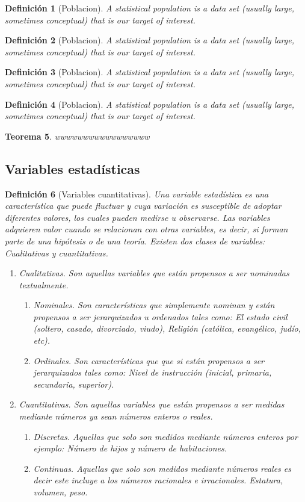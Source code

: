 \documentclass[a4paper]{report}
\newtheorem{thm}{Teorema}[chapter]
\newtheorem{defn}[thm]{Definición}
\begin{document}
\begin{defn}[Poblacion]
	A statistical population is a data set (usually large, sometimes conceptual) that is our target of interest.
\end{defn}
\begin{defn}[Poblacion]
	A statistical population is a data set (usually large, sometimes conceptual) that is our target of interest.
\end{defn}
\begin{defn}[Poblacion]
	A statistical population is a data set (usually large, sometimes conceptual) that is our target of interest.
\end{defn}
\begin{defn}[Poblacion]
	A statistical population is a data set (usually large, sometimes conceptual) that is our target of interest.
\end{defn}
\begin{thm}
	wwwwwwwwwwwwwwwww
\end{thm}


\subsection{Variables estadísticas}

\begin{defn}[Variables cuantitativas]
	Una variable estadística es una característica que puede fluctuar y cuya variación es susceptible de adoptar diferentes valores, los cuales pueden medirse u observarse. Las variables adquieren valor cuando se relacionan con otras variables, es decir, si forman parte de una hipótesis o de una teoría. Existen dos clases de variables: Cualitativas y cuantitativas.
	\begin{enumerate}
		\item  Cualitativas. Son aquellas variables que están propensos a ser nominadas textualmente.
		      \begin{enumerate}
			      \item  Nominales. Son características que simplemente nominan y están propensos a ser jerarquizados u ordenados tales como: El estado   civil (soltero, casado, divorciado, viudo), Religión (católica, evangélico, judío, etc).
			      \item  Ordinales. Son características que que si están propensos a ser jerarquizados tales como: Nivel de instrucción (inicial, primaria, secundaria, superior).
		      \end{enumerate}
		\item  Cuantitativas. Son aquellas variables que están propensos a ser medidas mediante números ya sean números enteros o reales.
		      \begin{enumerate}
			      \item  Discretas. Aquellas que solo son medidos mediante números enteros por ejemplo: Número de hijos y número de habitaciones.
			      \item  Continuas. Aquellas que solo son medidos mediante números reales es decir este incluye a los números racionales e irracionales. Estatura, volumen, peso.
		      \end{enumerate}
	\end{enumerate}
\end{defn}
\end{document}
